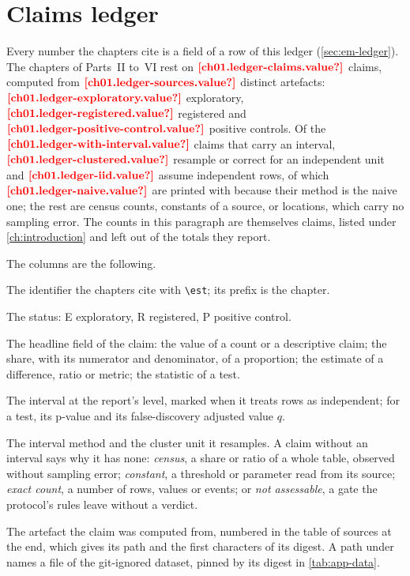 \chapter{Claims ledger}\label{app:claims-ledger}

Every number the chapters cite is a field of a row of this ledger (\cref{sec:em-ledger}). The chapters of
Parts~II to~VI rest on $\est{ch01.ledger-claims}{value}$ claims, computed from $\est{ch01.ledger-sources}{value}$
distinct artefacts: $\est{ch01.ledger-exploratory}{value}$ exploratory, $\est{ch01.ledger-registered}{value}$ registered
and $\est{ch01.ledger-positive-control}{value}$ positive controls. Of the $\est{ch01.ledger-with-interval}{value}$ claims
that carry an interval, $\est{ch01.ledger-clustered}{value}$ resample or correct for an independent unit and
$\est{ch01.ledger-iid}{value}$ assume independent rows, of which $\est{ch01.ledger-naive}{value}$ are printed with
\naivemark{} because their method is the naive one; the rest are census counts, constants of a source, or locations,
which carry no sampling error. The counts in this paragraph are themselves claims, listed under \cref{ch:introduction} and left out of
the totals they report.

The columns are the following.
\begin{description}[style=nextline]
  \item[Claim] The identifier the chapters cite with \verb|\est|; its prefix is the chapter.
  \item[St.] The status: E exploratory, R registered, P positive control.
  \item[Value] The headline field of the claim: the value of a count or a descriptive claim; the share, with its
  numerator and denominator, of a proportion; the estimate of a difference, ratio or metric; the statistic of a test.
  \item[Interval] The interval at the report's level, marked \naivemark{} when it treats rows as independent; for a
  test, its p-value and its false-discovery adjusted value $q$.
  \item[Method] The interval method and the cluster unit it resamples. A claim without an interval says why it has
  none: \emph{census}, a share or ratio of a whole table, observed without sampling error; \emph{constant}, a
  threshold or parameter read from its source; \emph{exact count}, a number of rows, values or events; or \emph{not
  assessable}, a gate the protocol's rules leave without a verdict.
  \item[Source] The artefact the claim was computed from, numbered in the table of sources at the end, which gives its
  path and the first characters of its digest. A path under  names a file of the git-ignored dataset,
  pinned by its digest in \cref{tab:app-data}.
\end{description}


